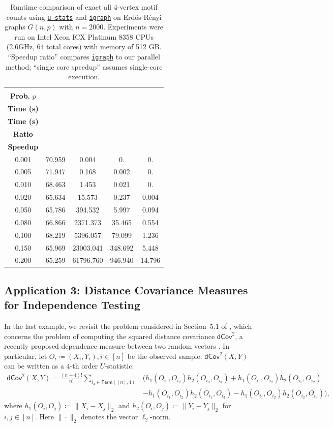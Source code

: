 \documentclass[twoside,11pt]{article}
\newcommand{\libref}[2]{\href{#2}{\texttt{#1}}}
\newcommand{\perm}[1]{\mathsf{Perm}(#1)}
\def\package{\libref{u-stats}{https://github.com/zrq1706/U-Statistics-python}}
\def\igraph{\libref{igraph}{https://igraph.org/}}
\begin{document}
\begin{table}[h!]
\centering
\caption{
Runtime comparison of exact all $4$-vertex motif counts using \package{} and \igraph{} on Erd\"{o}s-R\'{e}nyi graphs $G(n, p)$ with $n = 2000$. 
Experiments were run on Intel Xeon ICX Platinum 8358 CPUs (2.6GHz, 64 total cores) with memory of 512 GB.
“Speedup ratio” compares \igraph{} to our parallel method; “single core speedup” assumes single-core execution.
}
\label{tab:motif_counts_4}
\begin{tabular}{ccccc}
\toprule
\makecell{\textbf{Edge} \\ \textbf{Prob.} $p$} & \makecell{\textbf{\package{}} \\ \textbf{Time (s)}} & \makecell{\textbf{\igraph{}} \\ \textbf{Time (s)}} &\makecell{\textbf{Speedup} \\ \textbf{Ratio}} &  \makecell{\textbf{Single-Core} \\ \textbf{Speedup}} \\
\midrule
0.001 & 70.959 & 0.004 & 0. & 0. \\
0.005 & 71.947 & 0.168 & 0.002 & 0. \\
0.010 & 68.463 & 1.453 & 0.021 & 0. \\
0.020 & 65.634 & 15.573 & 0.237 & 0.004 \\
0.050 & 65.786 & 394.532 & 5.997 & 0.094 \\
0.080 & 66.866 & 2371.373 & 35.465 & 0.554 \\
0.100 & 68.219 & 5396.057 & 79.099 & 1.236 \\
0.150 & 65.969 & 23003.041 & 348.692 & 5.448 \\
0.200 & 65.259 & 61796.760 & 946.940 & 14.796 \\
\bottomrule
\end{tabular}
\end{table}

\subsection{Application 3: Distance Covariance Measures for Independence Testing}
\label{sec:dependence}

In the last example, we revisit the problem considered in Section~5.1 of \citet{shao2025u}, which concerns the problem of computing the squared distance covariance $\mathsf{dCov}^2$, a recently proposed dependence measure between two random vectors \citep{szekely2007measuring, yao2018testing}. In particular, let $O_i \coloneqq (X_i, Y_i), i \in [n]$ be the observed sample. $\mathsf{dCov}^2 (X, Y)$ can be written as a $4$-th order $U$-statistic:
\begin{align*}
    \mathsf{dCov}^2(X, Y) = \frac{(n - 4)!}{n!} \sum_{\bar{i}_{4} \in \perm{[n],4}} & \Bigg( h_1 (O_{i_1}, O_{i_2}) h_2 (O_{i_3}, O_{i_4}) + h_1 (O_{i_1}, O_{i_2}) h_2 (O_{i_1}, O_{i_2}) \\
    & - h_1 (O_{i_1}, O_{i_2}) h_2 (O_{i_1}, O_{i_3}) - h_1 (O_{i_1}, O_{i_2}) h_2 (O_{i_2}, O_{i_4}) \Bigg), 
\end{align*}
where $h_1 (O_i, O_j) \coloneqq \|X_i - X_j\|_2$ and $h_2 (O_i, O_j) \coloneqq \|Y_i - Y_j\|_2$ for $i, j \in [n]$. Here $\|\cdot\|_2$ denotes the vector $\ell_2$-norm. 
\end{document}
